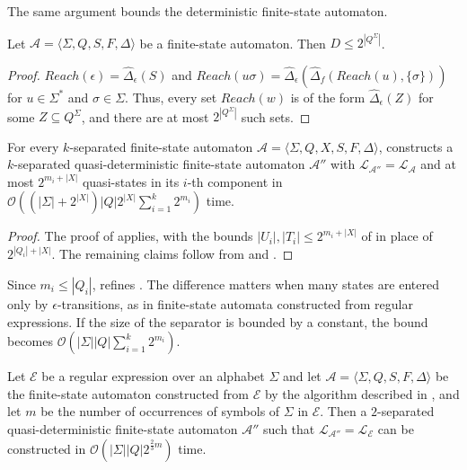 The same argument bounds the deterministic finite-state automaton.

\begin{proposition}\label{prop:essential_dfa}
  Let $\mathcal{A} = \langle \Sigma, Q, S, F, \Delta \rangle$ be a finite-state
  automaton. Then $D \leq 2^{|Q^\Sigma|}$.
\end{proposition}

\begin{proof}
  $Reach(\epsilon) = \hat{\Delta}_\epsilon(S)$ and $Reach(u\sigma) =
  \hat{\Delta}_\epsilon(\hat{\Delta}_f(Reach(u), \{ \sigma \}))$ for $u \in \Sigma^*$
  and $\sigma \in \Sigma$. Thus, every set $Reach(w)$ is of the form
  $\hat{\Delta}_\epsilon(Z)$ for some $Z \subseteq Q^\Sigma$, and there are at most
  $2^{|Q^\Sigma|}$ such sets.
\end{proof}

\begin{theorem}\label{thm:quasidet_components_essential}
  For every $k$-separated finite-state automaton $\mathcal{A} = \langle \Sigma, Q, X,
  S, F, \Delta \rangle$,  constructs a
  $k$-separated quasi-deterministic finite-state automaton $\mathcal{A}''$ with
  $\mathcal{L}_{\mathcal{A}''} = \mathcal{L}_\mathcal{A}$ and at most $2^{m_i + |X|}$
  quasi-states in its $i$-th component in $\mathcal{O}((|\Sigma| + 2^{|X|}) |Q|
  2^{|X|} \sum_{i=1}^k 2^{m_i})$ time.
\end{theorem}

\begin{proof}
  The proof of  applies, with the bounds
  $|U_i|, |T_i| \leq 2^{m_i + |X|}$ of  in place of
  $2^{|Q_i| + |X|}$. The remaining claims follow from 
  and .
\end{proof}

Since $m_i \leq |Q_i|$,  refines
. The difference matters when many states are entered
only by $\epsilon$-transitions, as in finite-state automata constructed from regular
expressions. If the size of the separator is bounded by a constant, the bound becomes
$\mathcal{O}(|\Sigma| |Q| \sum_{i=1}^k 2^{m_i})$.

  \begin{corollary}\label{cor:quasidet_regex}
    Let $\mathcal{E}$ be a regular expression over an alphabet $\Sigma$ and let
    $\mathcal{A} = \langle \Sigma, Q, S, F, \Delta \rangle$ be the finite-state
    automaton constructed from $\mathcal{E}$ by the algorithm described in
    , and let $m$ be the number of occurrences of symbols of $\Sigma$
    in $\mathcal{E}$. Then a $2$-separated quasi-deterministic finite-state automaton
    $\mathcal{A}''$ such that $\mathcal{L}_{\mathcal{A}''} = \mathcal{L}_\mathcal{E}$
    can be constructed in $\mathcal{O}(|\Sigma| |Q| 2^{\frac{2}{3} m})$ time.
  \end{corollary}

